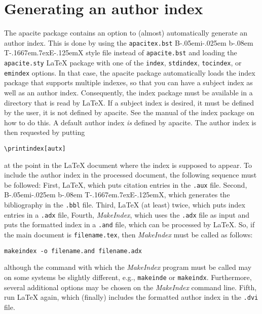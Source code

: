 \documentclass{article}
\def\BibTeX{{\rm B\kern-.05em{\sc i\kern-.025em b}\kern-.08em
    T\kern-.1667em\lower.7ex\hbox{E}\kern-.125emX}}%
\newcommand{\MakeIndex}{\textit{MakeIndex}}
\newcommand{\pkg}[1]{\textsf{#1}}%
\newcommand{\fname}[1]{\texttt{#1}}%
\newcommand{\pkgoption}[1]{\texttt{#1}}%
\begin{document}
\section{Generating an author index}
\label{sec:autindex}
The \pkg{apacite} package contains an option to (almost) automatically
generate an author index. This is done by using the \fname{apacitex.bst}
\BibTeX{} style file instead of \fname{apacite.bst} and loading the
\fname{apacite.sty} \LaTeX{} package with one of the \pkgoption{index},
\pkgoption{stdindex}, \pkgoption{tocindex}, or \pkgoption{emindex} options. In
that case, the \pkg{apacite} package automatically loads the \pkg{index}
package that supports multiple indexes, so that you can have a subject index
as well as an author index. Consequently, the \pkg{index} package must be
available in a directory that is read by \LaTeX{}. If a subject index is
desired, it must be defined by the user, it is not defined by \pkg{apacite}.
See the manual of the \pkg{index} package on how to do this. A default author
index \emph{is} defined by \pkg{apacite}. The author index is then requested
by putting
\begin{verbatim}
\printindex[autx]
\end{verbatim}
at the point in the \LaTeX{} document where the index is supposed to appear.
To include the author index in the processed document, the following sequence
must be followed: First, \LaTeX{}, which puts citation entries in the
\fname{.aux} file. Second, \BibTeX{}, which generates the bibliography in the
\fname{.bbl} file. Third, \LaTeX{} (at least) twice, which puts index entries
in a \fname{.adx} file, Fourth, \MakeIndex{}, which uses the \fname{.adx} file
as input and puts the formatted index in a \fname{.and} file, which can be
processed by \LaTeX{}. So, if the main document is \fname{filename.tex}, then
\MakeIndex{} must be called as follows:
\begin{verbatim}
makeindex -o filename.and filename.adx
\end{verbatim}
although the command with which the \MakeIndex{} program must be called may on
some systems be slightly different, e.g., \fname{makeinde} or
\fname{makeindx}. Furthermore, several additional options may be chosen on the
\MakeIndex{} command line. Fifth, run \LaTeX{} again, which (finally) includes
the formatted author index in the \fname{.dvi} file.
\end{document}
